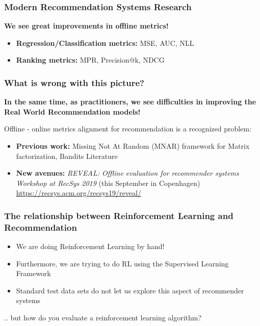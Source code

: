 \begin{frame}
  \frametitle{Modern Recommendation Systems Research}
  
  \textbf{We see great improvements in offline metrics!}
  
  \begin{itemize}
  \item \textbf{Regression/Classification metrics:} MSE, AUC, NLL
  \item \textbf{Ranking metrics:} MPR, Precision@k, NDCG
  \end{itemize}
  
\end{frame}


\begin{frame}
  \frametitle{What is wrong with this picture?}
  
	\textbf{In the same time, as practitioners, we see difficulties in improving the Real World Recommendation models!}

	Offline - online metrics alignment for recommendation is a recognized problem:
	\begin{itemize}
	\item \textbf{Previous work:} Missing Not At Random (MNAR) framework for Matrix factorization, Bandits Literature
	\item \textbf{New avenues:}  \emph{REVEAL: Offline evaluation for recommender systems Workshop at RecSys 2019} (this September in Copenhagen) \url{https://recsys.acm.org/recsys19/reveal/}
	\end{itemize}
  
\end{frame}


\begin{frame}
  \frametitle{The relationship between Reinforcement Learning and Recommendation}

\begin{itemize}
\item We are doing Reinforcement Learning by hand!
\pause
\item Furthermore, we are trying to do RL using the Supervised Learning Framework
\pause
\item Standard test data sets do not let us explore this aspect of recommender systems
\end{itemize}

\pause
.. but how do you evaluate a reinforcement learning algorithm?
\end{frame}

  



